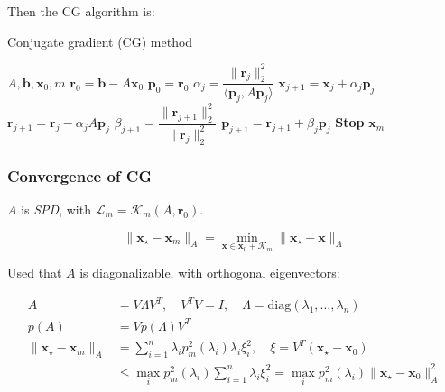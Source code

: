 Then the CG algorithm is:
\begin{algorithm}[H]
    \caption{Conjugate gradient (CG) method}
    \begin{algorithmic}[0]
        \Require $A, \mathbf{b}, \mathbf{x}_0, m$
        \State $\mathbf{r}_0 = \mathbf{b} - A\mathbf{x}_0$
        \State $\mathbf{p}_0 = \mathbf{r}_0$
        \State $\alpha_j = \dfrac{\|\mathbf{r}_j\|_2^2}{\langle \mathbf{p}_j, A \mathbf{p}_j \rangle}$
        \State $\mathbf{x}_{j+1} = \mathbf{x}_j + \alpha_j \mathbf{p}_j$
        \State $\mathbf{r}_{j+1} = \mathbf{r}_j - \alpha_j A \mathbf{p}_j$
        \State $\beta_{j+1} = \dfrac{\|\mathbf{r}_{j+1}\|_2^2}{\|\mathbf{r}_j\|_2^2}$
        \State $\mathbf{p}_{j+1} = \mathbf{r}_{j+1} + \beta_j \mathbf{p}_j$
         \textbf{Stop}
        \EndIf
        \EndFor
        \Return $\mathbf{x}_m$
    \end{algorithmic}
\end{algorithm}

\subsubsection{Convergence of CG}
$A$ is \emph{SPD}, with $\mathcal{L}_m = \mathcal{K}_m(A, \mathbf{r}_0)$.

\[
    \|\mathbf{x}_\star - \mathbf{x}_m\|_A = \min_{\mathbf{x} \in \mathbf{x}_0 + \mathcal{K}_m}\|\mathbf{x}_\star - \mathbf{x}\|_A
\]

Used that $A$ is diagonalizable, with orthogonal eigenvectors:

\begin{align*}
    A                                     & =V\Lambda V^T, \quad V^TV = I, \quad \Lambda = \text{diag}(\lambda_1, \ldots, \lambda_n)                                      \\
    p(A)                                  & = Vp(\Lambda)V^T                                                                                                              \\
    \|\mathbf{x}_\star - \mathbf{x}_m\|_A & = \sum_{i=1}^n \lambda_i p_m^2(\lambda_i) \lambda_i \xi_i^2, \quad \xi = V^T(\mathbf{x}_\star - \mathbf{x}_0)                 \\
                                          & \leq \max_i p_m^2(\lambda_i) \sum_{i=1}^n \lambda_i \xi_i^2 = \max_i p_m^2(\lambda_i) \|\mathbf{x}_\star - \mathbf{x}_0\|_A^2
\end{align*}

